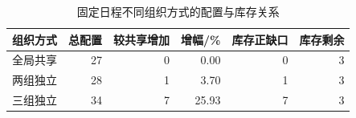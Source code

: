 \begin{table}[htbp]\centering\small
\caption{固定日程不同组织方式的配置与库存关系}\label{tab:rev_q4_organization}
\begin{tabular}{lrrrrr}\toprule
组织方式 & 总配置 & 较共享增加 & 增幅/\% & 库存正缺口 & 库存剩余\\\midrule
全局共享 & 27 & 0 & 0.00 & 0 & 3\\
两组独立 & 28 & 1 & 3.70 & 1 & 3\\
三组独立 & 34 & 7 & 25.93 & 7 & 3\\
\bottomrule\end{tabular}
\end{table}
